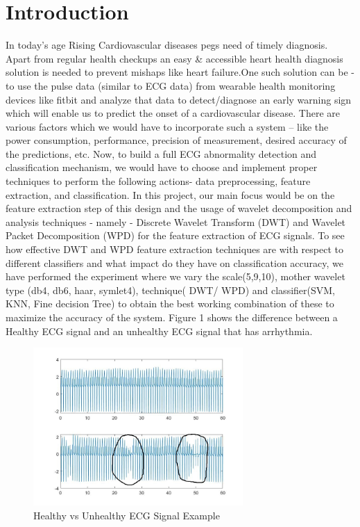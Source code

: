 \documentclass[10pt,twocolumn,letterpaper]{article}
\begin{document}
\section{Introduction}
\label{sec:intro}
In today’s age Rising Cardiovascular diseases pegs need of timely diagnosis. Apart from regular health checkups an easy \& accessible heart health diagnosis solution is needed to prevent mishaps like heart failure.One such solution can be - to use the pulse data (similar to ECG data) from wearable health monitoring devices like fitbit and analyze that data to detect/diagnose an early warning sign which will enable us to predict the onset of a cardiovascular disease. There are various factors which we would have to incorporate such a system – like the power consumption, performance, precision of measurement, desired accuracy of the predictions, etc.
Now, to build a full ECG abnormality detection and classification mechanism, we would have to choose and implement proper techniques to perform the following actions- data preprocessing, feature extraction, and classification. In this project, our main focus would be on the feature extraction step of this design and the usage of wavelet decomposition and analysis techniques - namely - Discrete Wavelet Transform (DWT) and Wavelet Packet Decomposition (WPD) for the feature extraction of ECG signals.
To see how effective DWT and WPD feature extraction techniques are with respect to different classifiers and what impact do they have on classification accuracy, we have performed the experiment where we vary the scale(5,9,10), mother wavelet type (db4, db6, haar, symlet4), technique( DWT/ WPD) and classifier(SVM, KNN, Fine decision Tree)  to obtain the best working combination of these to maximize the accuracy of the system.
Figure 1 shows the difference between a Healthy ECG signal and an unhealthy ECG signal that has arrhythmia.
\begin{figure}[h!]
\includegraphics[width=8cm]{healthyVSunhealthy.JPG}
\caption{Healthy vs Unhealthy  ECG Signal Example}
\label{Comparison}
\end{figure}
\end{document}
